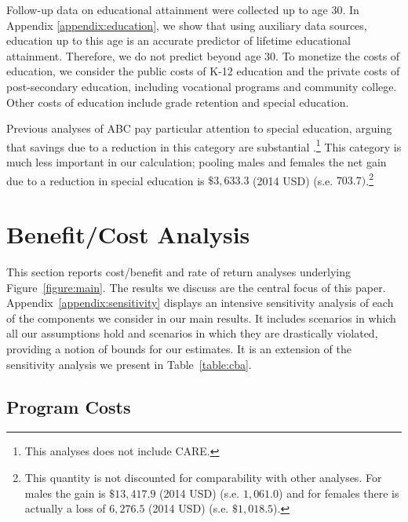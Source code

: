 Follow-up data on educational attainment were collected up to age 30. In Appendix \ref{appendix:education}, we show that using auxiliary data sources, education up to this age is an accurate predictor of lifetime educational attainment. Therefore, we do not predict beyond age 30. To monetize the costs of education, we consider the public costs of K-12 education and the private costs of post-secondary education, including vocational programs and community college. Other costs of education include grade retention and special education.

Previous analyses of ABC pay particular attention to special education, arguing that savings due to a reduction in this category are substantial \citep{Barnett_Masse_2002_benefitcost,Barnett_Masse_2007_EER}.\footnote{This analyses does not include CARE.} This category is much less important in our calculation; pooling males and females the net gain due to a reduction in special education is $\$3,633.3$ (2014 USD) (s.e. $703.7)$.\footnote{This quantity is not discounted for comparability with other analyses. For males the gain is $\$13,417.9$ (2014 USD) (s.e. $1,061.0$) and for females there is actually a loss of $6,276.5$ (2014 USD) (s.e. $\$1,018.5$).}

\section{Benefit/Cost Analysis} \label{section:cbaresults}

This section reports cost/benefit and rate of return analyses underlying Figure~\ref{figure:main}. The results we discuss are the central focus of this paper. Appendix~\ref{appendix:sensitivity} displays an intensive sensitivity analysis of each of the components we consider in our main results. It includes scenarios in which all our assumptions hold and scenarios in which they are drastically violated, providing a notion of bounds for our estimates. It is an extension of the sensitivity analysis we present in Table~\ref{table:cba}.

\subsection{Program Costs} \label{section:programscosts}

